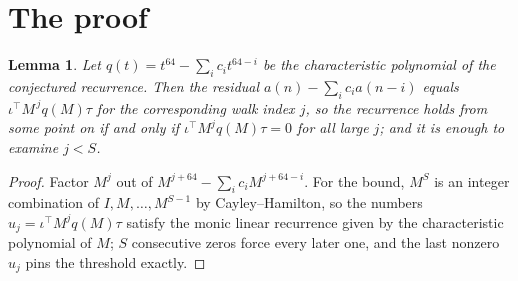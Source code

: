 \documentclass[11pt,a4paper]{article}
\theoremstyle{plain}
\newtheorem{lemma}[theorem]{Lemma}
\theoremstyle{definition}
\begin{document}
\section{The proof}

\begin{lemma}\label{lem:crit}
Let $q(t)=t^{64}-\sum_i c_it^{64-i}$ be the characteristic polynomial of the
conjectured recurrence. Then the residual $a(n)-\sum_ic_ia(n-i)$ equals
$\iota^{\!\top}M^{\,j}q(M)\tau$ for the corresponding walk index $j$, so the
recurrence holds from some point on if and only if $\iota^{\!\top}M^{j}q(M)\tau=0$ for all
large $j$; and it is enough to examine $j<S$.
\end{lemma}

\begin{proof}
Factor $M^{j}$ out of $M^{j+64}-\sum_ic_iM^{j+64-i}$. For the bound, $M^{S}$
is an integer combination of $I,M,\dots,M^{S-1}$ by Cayley--Hamilton, so the numbers
$u_j=\iota^{\!\top}M^{j}q(M)\tau$ satisfy the monic linear recurrence given by the
characteristic polynomial of $M$; $S$ consecutive zeros force every later one, and the last
nonzero $u_j$ pins the threshold exactly.
\end{proof}
\end{document}
